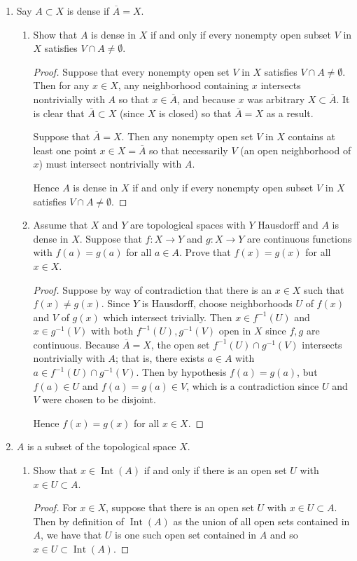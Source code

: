 \documentclass[11pt]{article}
\DeclareMathOperator{\Int}{Int}
\begin{document}
\begin{enumerate}
    \item Say $A\subset X$ is dense if $\overline{A} = X$. \begin{enumerate}[label=(\alph*)]
      \item Show that $A$ is dense in $X$ if and only if every nonempty open subset $V$ in $X$ satisfies $V\cap A\neq \emptyset$.
      \begin{proof}
        Suppose that every nonempty open set $V$ in $X$ satisfies $V\cap A\neq \emptyset$. Then for any $x\in X$, any neighborhood containing $x$ intersects nontrivially with $A$ so that $x\in \overline{A}$, and because $x$ was arbitrary $X\subset \overline{A}$. It is clear that $\overline{A}\subset X$ (since $X$ is closed) so that $\overline{A} = X$ as a result.

        Suppose that $\overline{A} = X$. Then any nonempty open set $V$ in $X$ contains at least one point $x\in X = \overline{A}$ so that necessarily $V$ (an open neighborhood of $x$) must intersect nontrivially with $A$.

        Hence $A$ is dense in $X$ if and only if every nonempty open subset $V$ in $X$ satisfies $V\cap A\neq \emptyset$.
      \end{proof}
      \item Assume that $X$ and $Y$ are topological spaces with $Y$ Hausdorff and $A$ is dense in $X$. Suppose that $f\colon X\to Y$ and $g\colon X\to Y$ are continuous functions with $f(a) = g(a)$ for all $a\in A$. Prove that $f(x) = g(x)$ for all $x\in X$.
      \begin{proof}
        Suppose by way of contradiction that there is an $x\in X$ such that $f(x)\neq g(x)$. Since $Y$ is Hausdorff, choose neighborhoods $U$ of $f(x)$ and $V$ of $g(x)$ which intersect trivially. Then $x\in f^{-1}(U)$ and $x\in g^{-1}(V)$ with both $f^{-1}(U),g^{-1}(V)$ open in $X$ since $f,g$ are continuous. Because $\overline{A} = X$, the open set $f^{-1}(U)\cap g^{-1}(V)$ intersects nontrivially with $A$; that is, there exists $a\in A$ with $a\in f^{-1}(U)\cap g^{-1}(V)$. Then by hypothesis $f(a) = g(a)$, but $f(a)\in U$ and $f(a) = g(a)\in V$, which is a contradiction since $U$ and $V$ were chosen to be disjoint.

        Hence $f(x) = g(x)$ for all $x\in X$.
      \end{proof}
    \end{enumerate}
    \item $A$ is a subset of the topological space $X$. \begin{enumerate}[label=(\alph*)]
      \item Show that $x\in \Int(A)$ if and only if there is an open set $U$ with $x\in U\subset A$.
      \begin{proof}
        For $x\in X$, suppose that there is an open set $U$ with $x\in U\subset A$. Then by definition of $\Int(A)$ as the union of all open sets contained in $A$, we have that $U$ is one such open set contained in $A$ and so $x\in U\subset \Int(A)$.


\end{proof}
\end{enumerate}
\end{enumerate}
\end{document}
